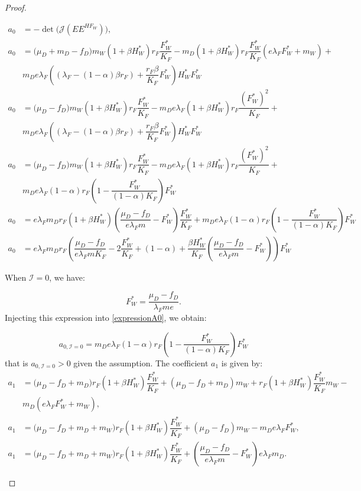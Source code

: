 \documentclass{article}
\newcommand{\lfw}{\lambda_{F}}
\newcommand{\lfw}{\lambda_{F}}
\newcommand{\cI}{\mathcal{I}}
\begin{document}
\begin{proof}
\begin{itemize}
\begin{subequations}
\begin{align}
a_0 &= -\det\Big(\mathcal{J}(EE^{H F_W})\Big), \\
a_0 &= \Big(\mu_D + m_D -f_D \Big) m_W (1+\beta H_W^*) r_F \dfrac{F^*_W}{K_F}  - m_D (1 + \beta H_W^*) r_F \dfrac{F_W^*}{K_F}(e\lfw F_W^* + m_W) + \\
\nonumber
&  m_D e \lfw  \left((\lfw - (1-\alpha)\beta r_F)  + \dfrac{r_F\beta}{K_F} F_W^* \right)H_W^* F_W^* \\
a_0 &= \Big(\mu_D -f_D \Big) m_W (1+\beta H_W^*) r_F \dfrac{F^*_W}{K_F}  - m_D e\lfw (1 + \beta H_W^*) r_F \dfrac{(F_W^*)^2}{K_F} + \\
\nonumber
&  m_D e \lfw \left((\lfw - (1-\alpha)\beta r_F)  + \dfrac{r_F\beta}{K_F} F_W^* \right)H_W^*F_W^* \\
a_0 &= \Big(\mu_D -f_D \Big) m_W (1+\beta H_W^*) r_F \dfrac{F^*_W}{K_F}  - m_D e\lfw (1 + \beta H_W^*) r_F \dfrac{(F_W^*)^2}{K_F} + \\
\nonumber
&  m_D e \lfw (1- \alpha) r_F \left(1 - \dfrac{F_W^*}{(1- \alpha)K_F}\right) F_W^* \\
a_0 &= e \lfw m_D r_F (1 + \beta H_W^*) \left(\dfrac{\mu_D -f_D }{e \lfw m} - F_W^*\right) \dfrac{F_W^*}{K_F} + m_D e \lfw (1- \alpha) r_F \left(1 - \dfrac{F_W^*}{(1- \alpha)K_F}\right) F_W^*  \\
a_0 &= e \lfw m_D r_F \left(\dfrac{\mu_D -f_D }{e \lfw m K_F} - 2\dfrac{F_W^*}{K_F} + (1-\alpha) + \dfrac{\beta H_W^*}{K_F} \left(\dfrac{\mu_D -f_D }{e \lfw m} - F_W^*\right) \right) F_W^*  \label{expressionA0}
\end{align}
\end{subequations}

When $\cI = 0$, we have:

\begin{equation*}
F_W^* = \dfrac{\mu_D - f_D}{\lfw m e}.
\end{equation*} 
Injecting this expression into \eqref{expressionA0}, we obtain:

\begin{equation*}
a_{0, \cI=0} = m_D e \lfw (1- \alpha) r_F \left(1 - \dfrac{F_W^*}{(1- \alpha)K_F}\right) F_W^* 
\end{equation*}
that is $a_{0, \cI=0}>0$ given the assumption. The coefficient $a_1$ is given by:
\begin{subequations}
\begin{align}
a_1 &= \big( \mu_D  -f_D + m_D) r_F(1+ \beta H_W^*) \dfrac{F^*_W}{K_F} + (\mu_D -f_D + m_D) m_W + r_F(1+ \beta H_W^*) \dfrac{F_W^*}{K_F} m_W - \\ \nonumber &m_D (e\lfw F^*_W + m_W), \\
a_1 &= \big( \mu_D  -f_D + m_D + m_W) r_F(1+ \beta H_W^*) \dfrac{F^*_W}{K_F} + (\mu_D -f_D) m_W  - m_D e\lfw F^*_W, \\
a_1 &= \big( \mu_D  -f_D + m_D + m_W) r_F(1+ \beta H_W^*) \dfrac{F^*_W}{K_F} + \left(\dfrac{\mu_D -f_D}{e\lfw m} - F_W^*\right) e \lfw m_D . \label{expressionA1}
\end{align}
\end{subequations}


\end{itemize}
\end{proof}
\end{document}
